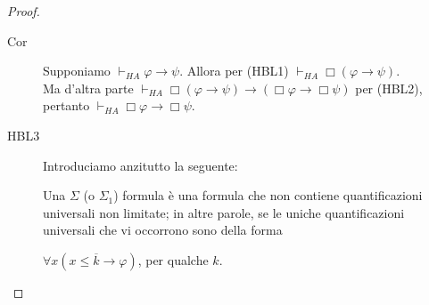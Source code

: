 \begin{proof}
\begin{description}




 
   
   

    
\item[Cor] Supponiamo $\vdash_{HA}\varphi\to\psi$. Allora per (HBL1) $\vdash_{HA}\Box(\varphi\to\psi)$.\\
Ma d'altra parte $\vdash_{HA}\Box(\varphi\to\psi)\to(\Box\varphi\to\Box\psi)$ per (HBL2), pertanto $\vdash_{HA}\Box\varphi\to\Box\psi$.\\

\item[HBL3] Introduciamo anzitutto la seguente:

\begin{defi}
Una $\Sigma$ (o $\Sigma_1$) formula è una formula che non contiene quantificazioni universali non limitate; in altre parole, se le uniche quantificazioni universali che vi occorrono sono della forma
\begin{center}
$\forall x(x\le\overline k\to\varphi)$, per qualche $k$.\\
\end{center}
\end{defi}


\end{description}
\end{proof}
